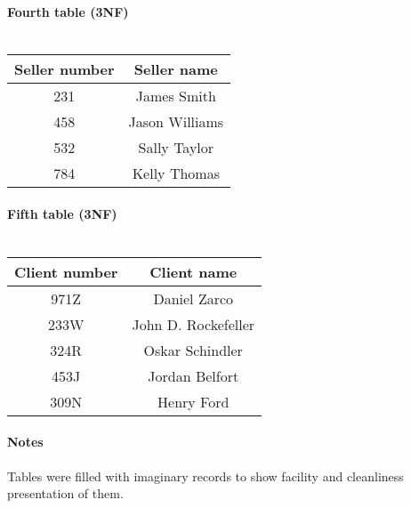 \documentclass{article}
\begin{document}
\paragraph{Fourth table (3NF)\\\\}
\begin{tabular}{|c|c|}
Seller number & Seller name\\
\hline
231 & James Smith\\
458 & Jason Williams\\
532 & Sally Taylor\\
784 & Kelly Thomas\\
\end{tabular}
\paragraph{Fifth table (3NF)\\\\}
\begin{tabular}{|c|c|}
Client number & Client name\\
\hline
971Z & Daniel Zarco\\
233W & John D. Rockefeller\\
324R & Oskar Schindler\\
453J & Jordan Belfort\\
309N & Henry Ford\\
\end{tabular}
\paragraph{Notes\\}
Tables were filled with imaginary records to show facility and cleanliness presentation of them.
\end{document}
